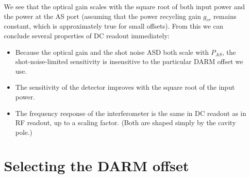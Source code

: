 We see that the optical gain scales with the square root of both input
power and the power at the AS port (assuming that the power recycling
gain $g_{cr}$ remains constant, which is approximately true for small
offsets).  From this we can conclude several properties of DC readout
immediately:
%
\begin{itemize}
\item Because the optical gain and the shot noise ASD both scale with
  $P_{AS}$, the shot-noise-limited sensitivity is insensitive to the
  particular DARM offset we use.
\item The sensitivity of the detector improves with the square root of
  the input power.
\item The frequency response of the interferometer is the same in DC
  readout as in RF readout, up to a scaling factor. (Both are shaped
  simply by the cavity pole.)
\end{itemize}

\section{Selecting the DARM offset}

